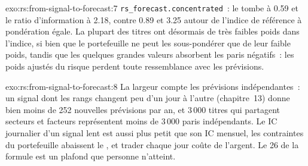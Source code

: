 \begin{solution}{exo:rs:from-signal-to-forecast:7}
\texttt{rs\_forecast.concentrated}~: le  tombe à 0.59 et le ratio d'information à 2.18, contre 0.89 et 3.25 autour de l'indice de
référence à pondération égale. La plupart des titres ont désormais de très faibles poids dans l'indice, si bien que le portefeuille ne peut les sous-pondérer que de leur faible poids, tandis que les quelques grandes valeurs absorbent les
paris négatifs~: les poids ajustés du risque perdent toute ressemblance avec les prévisions.
\end{solution}

\begin{solution}{exo:rs:from-signal-to-forecast:8}
La largeur compte les prévisions indépendantes~: un signal dont les rangs changent peu d'un jour à l'autre (chapitre~13) donne bien moins de 252 nouvelles prévisions par an,
et 3\,000 titres qui partagent secteurs et facteurs représentent moins de 3\,000 paris indépendants. Le IC journalier d'un signal lent est aussi plus petit que son
IC mensuel, les contraintes du portefeuille abaissent le , et trader chaque jour coûte de l'argent. Le 26 de la formule est un plafond que personne n'atteint.
\end{solution}

